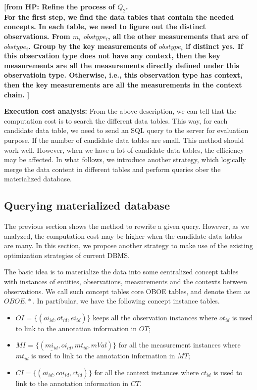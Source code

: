 \documentclass[conference]{IEEEtran}
\newcommand{\from}[2]{{\bf[{\sc from #1:} #2]}}
\begin{document}
\from{HP}{Refine the process of $Q_2$.\\
For the first step, we find the data tables that contain the needed concepts. 
In each table, we need to figure out the distinct observations. 
From $m_i$ $obstype_i$, all the other measurements that are of
$obstype_i$. 
Group by the key measurements of $obstype_i$ if distinct yes.
If this observation type does not have any context, then the key
measurements are all the measurements directly defined under this
observatioin type. Otherwise, i.e., this observation type has context,
then the key measurements are all the measurements in the context
chain. }


{\bf Execution cost analysis:} 
From the above description, we can tell that the computation cost is to search the different data
tables. This way, for each candidate data table, we need to send an
SQL query to the server for evaluation purpose.
If the number of candidate data tables are small. This method should
work well. However, when we have a lot of candidate data tables, the
efficiency may be affected. 
In what follows, we introduce another strategy, which logically merge
the data content in different tables and perform queries ober the
materialized database. 

\subsection{Querying materialized database}\label{sec:matdb}

The previous section shows the method to rewrite a given query. 
However, as we analyzed, the computation cost may be higher when the
candidate data tables are many. In this section, we propose another
strategy to make use of the existing optimization strategies of
current DBMS. 

The basic idea is to materialize the data into some centralized
concept tables with instances of entities, observations, measurements
and the contexts between observations. 
We call such concept tables core OBOE tables, and denote them as
$OBOE.*$. 
In partibular, we have the following concept instance tables. 
\begin{itemize}
\item $OI$ = $\{(\underline{oi_{id}}, ot_{id}, ei_{id})\}$ keeps
  all the observation instances where $ot_{id}$ is used to link to the
  annotation information in $OT$; 
\item $MI$ = $\{(\underline{mi_{id}}, oi_{id}, mt_{id},
  mVal)\}$ for all the measurement instances where $mt_{id}$ is used to link to the
  annotation information in $MT$; 
\item $CI =\{(\underline{oi_{id},coi_{id},ct_{id}})\}$ for
  all the context instances where $ct_{id}$ is used to link to the
  annotation information in $CT$. 
\end{itemize}
\end{document}
